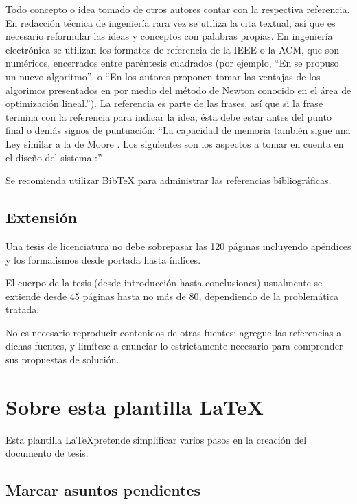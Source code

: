 Todo concepto o idea tomado de otros autores contar con la respectiva
referencia. En redacción técnica de ingeniería rara vez se utiliza la cita
textual, así que es necesario reformular las ideas y conceptos con palabras
propias. En ingeniería electrónica se utilizan los formatos de referencia de la
IEEE o la ACM, que son numéricos, encerrados entre paréntesis cuadrados (por
ejemplo, ``En \cite{Davis1963} se propuso un nuevo algoritmo'', o ``En
\cite{ProakisManolakis1998} los autores proponen tomar las ventajas de los
algorimos presentados en \cite{Oppenheim1998,Roberts2005,Haykin2001} por medio
del método de Newton \cite{Burrus1998} conocido en el área de optimización
lineal.''). La referencia es parte de las frases, así que si la frase termina
con la referencia para indicar la idea, ésta debe estar antes del punto final o
demás signos de puntuación: ``La capacidad de memoria también sigue una Ley
similar a la de Moore \cite{Octave}. Los siguientes son los aspectos a tomar en
cuenta en el diseño del sistema \cite{Lindner2002}:''

Se recomienda utilizar BibTeX para administrar las referencias bibliográficas.

\subsection{Extensión}

Una tesis de licenciatura no debe sobrepasar las 120 páginas incluyendo
apéndices y los formalismos desde portada hasta índices.

El cuerpo de la tesis (desde introducción hasta conclusiones) usualmente se
extiende desde 45 páginas hasta no más de 80, dependiendo de la problemática
tratada.

No es necesario reproducir contenidos de otras fuentes: agregue las referencias
a dichas fuentes, y limítese a enunciar lo estrictamente necesario para
comprender sus propuestas de solución.

\section{Sobre esta plantilla \LaTeX}

Esta plantilla \LaTeX pretende simplificar varios pasos en la creación del
documento de tesis.

\subsection{Marcar asuntos pendientes}

